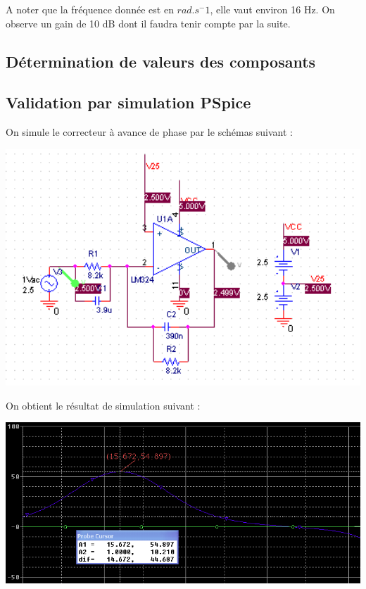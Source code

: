 \documentclass[11pt, french]{article} %
\begin{document}
A noter que la fréquence donnée est en $rad.s^-1$, elle vaut environ 16 Hz. On observe un gain de 10 dB dont il faudra tenir compte par la suite. 
\subsection{Détermination de valeurs des composants}


\subsection{Validation par simulation PSpice}

On simule le correcteur à avance de phase par le schémas suivant : 

\begin{center}
\includegraphics[width = 15cm]{SolutionAnalogique/schAvph.png} 
\end{center}

On obtient le résultat de simulation suivant : 

\begin{center}
\includegraphics[width = 15cm]{SolutionAnalogique/simuAvph.png} 
\end{center}
\end{document}
